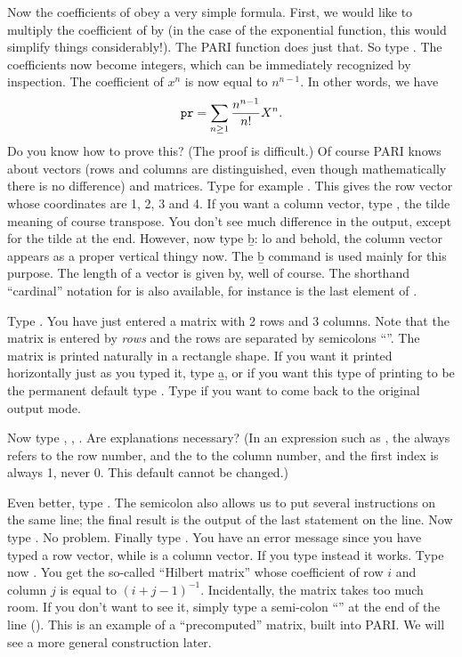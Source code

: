 Now the coefficients of  obey a very simple formula. First, we would
like to multiply the coefficient of  by  (in the case of
the exponential function, this would simplify things considerably!). The PARI
function  does just that. So type .
The coefficients now become integers, which can be immediately recognized by
inspection. The coefficient of $x^n$ is now equal to
$n^{n-1}$. In other words, we have
%
$${\tt pr} = \sum_{n\ge1}{{n^{n-1}}\over{n!}} X^{n}.$$
%
Do you know how to prove this? (The proof is difficult.)
\smallskip
%
Of course PARI knows about vectors (rows and columns are distinguished, even
though mathematically there is no difference) and matrices. Type for example
\kbd{[1,2,3,4]}. This gives the row vector whose coordinates are 1, 2, 3 and
4.  If you want a column vector, type \kbd{[1,2,3,4]\til}, the tilde meaning
of course transpose. You don't see much difference in the output, except for
the tilde at the end. However, now type \b{b}: lo and behold, the column
vector appears as a proper vertical thingy now. The \b{b} command is used
mainly for this purpose. The length of a vector is given by, well
 of course. The shorthand ``cardinal'' notation  for
 is also available, for instance  is the last
element of .

Type . You have just entered a matrix with 2 rows and
3 columns. Note that the matrix is entered by \emph{rows} and the rows are
separated by semicolons ``\kbd{;}''. The matrix is printed naturally in a
rectangle shape. If you want it printed horizontally just as you typed it,
type \b{a}, or if you want this type of printing to be the permanent default
type . Type  if you want to
come back to the original output mode.

Now type , , . Are explanations necessary?
(In an expression such as , the  always refers to the
row number, and the  to the column number, and the first index is
always 1, never 0. This default cannot be changed.)

Even better, type . The semicolon also allows us to put
several instructions on the same line; the final result is the output of
the last statement on the line. Now type . No
problem. Finally type . You have an error message since you
have typed a row vector, while  is a column vector. If you type
instead  it works. \smallskip
%
\label{se:types}
Type now . You get the so-called ``Hilbert matrix''
whose coefficient of row $i$ and column $j$ is equal to $(i+j-1)^{-1}$.
Incidentally, the matrix  takes too much room. If you don't want to
see it, simply type a semi-colon ``\kbd{;}'' at the end of the line
(). This is an example of a ``precomputed'' matrix,
built into PARI. We will see a more general construction later.

